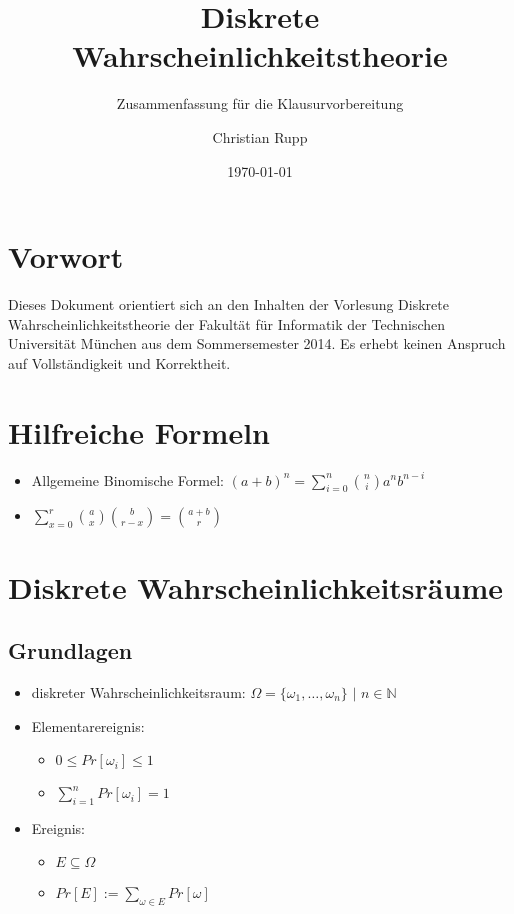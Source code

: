 \documentclass[a4,12pt]{scrartcl}
\title{Diskrete Wahrscheinlichkeitstheorie}
\subtitle{Zusammenfassung für die Klausurvorbereitung}
\author{Christian Rupp}
\date{\today}
\begin{document}
\maketitle

\newpage

\tableofcontents

\section{Vorwort}

Dieses Dokument orientiert sich an den Inhalten der Vorlesung Diskrete Wahrscheinlichkeitstheorie der Fakultät für Informatik der Technischen Universität München aus dem Sommersemester 2014.
Es erhebt keinen Anspruch auf Vollständigkeit und Korrektheit.

\section{Hilfreiche Formeln}

\begin{itemize}
\item Allgemeine Binomische Formel: $(a+b)^n=\sum^n_{i=0}\binom {n}{i}a^nb^{n-i}$
\item $\sum^r_{x=0}\binom{a}{x}\binom{b}{r-x}=\binom{a+b}{r}$
\end{itemize}

\section{Diskrete Wahrscheinlichkeitsräume}

\subsection{Grundlagen}

\begin{itemize}
\item diskreter Wahrscheinlichkeitsraum: $\Omega = \{\omega_1,\ldots,\omega_n\}$ $|$ $n\in \mathbb{N}$
\item Elementarereignis:\\
	\begin{itemize}
	\item $0 \leq Pr[\omega_i]\leq 1$
	\item $\sum_{i=1}^nPr[\omega_i]=1$
	\end{itemize}
\item Ereignis:\\
	\begin{itemize}
	\item $E\subseteq\Omega$
	\item $Pr[E]:=\sum_{\omega\in E}Pr[\omega]$
	\end{itemize}
\end{itemize}
\end{document}
